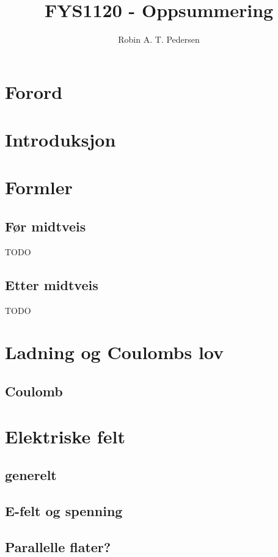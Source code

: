\documentclass{article}
\begin{document}
  \title{FYS1120 - Oppsummering}
  \author{Robin A. T. Pedersen}
  \maketitle
  \tableofcontents

  \section{Forord}
    
  \section{Introduksjon}
    
  \section{Formler}
    \subsection{Før midtveis}
      
      TODO
    \subsection{Etter midtveis}
      TODO
  \section{Ladning og Coulombs lov}
    \subsection{Coulomb}
      
  \section{Elektriske felt}
    \subsection{generelt}
      
    \subsection{E-felt og spenning}
      
    \subsection{Parallelle flater?}
      
\end{document}
